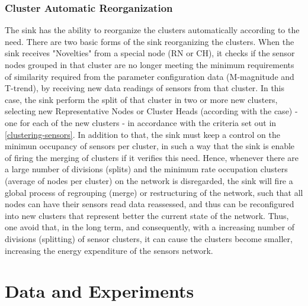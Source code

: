 \documentclass[conference]{IEEEtran}
\begin{document}
\subsubsection{Cluster Automatic Reorganization}

The sink has the ability to reorganize the clusters automatically according to
the need. There are two basic forms of the sink reorganizing the clusters. When
the sink receives "Novelties" from a special node (RN or CH), it checks if the
sensor nodes grouped in that cluster are no longer meeting the minimum
requirements of similarity required from the parameter configuration data
(M-magnitude and T-trend), by receiving new data readings of sensors from that
cluster. In this case, the sink perform the split of that cluster in two or more
new clusters, selecting new Representative Nodes or Cluster Heads (according
with the case) - one for each of the new clusters - in accordance with the
criteria set out in \ref{clustering-sensors}. In addition to that, the sink must
keep a control on the minimun occupancy of sensors per cluster, in such a way
that the sink is enable of firing the merging of clusters if it verifies this
need. Hence, whenever there are a large number of divisions (splits) and the
minimum rate occupation clusters (average of nodes per cluster) on the network
is disregarded, the sink will fire a global process of regrouping (merge) or
restructuring of the network, such that all nodes can have their sensors read
data reassessed, and thus can be reconfigured into new clusters that represent
better the current state of the network. Thus, one avoid that, in the long term,
and consequently, with a increasing number of divisions (splitting) of sensor
clusters, it can cause the clusters become smaller, increasing the energy
expenditure of the sensors network.


\section{Data and Experiments}
\label{data-and-experiments}
\end{document}
